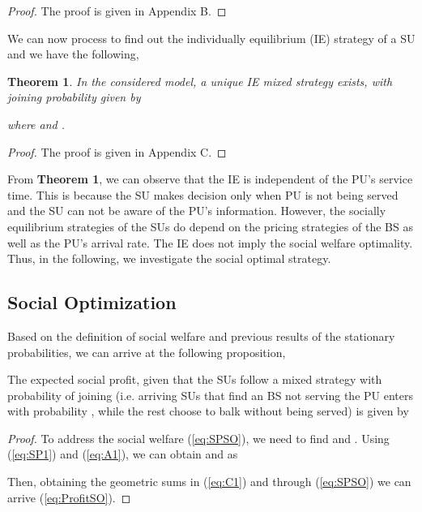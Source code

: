 \documentclass[journal]{IEEEtran}
\begin{document}
\begin{proof}
The proof is given in Appendix B.
\end{proof}

We can now process to find out the individually
equilibrium (IE) strategy of a SU and we have the following,

\theoremstyle{theorem}
\newtheorem{theorem}{Theorem}
\begin{theorem}
In the considered model, a unique IE mixed strategy exists, with
joining probability  given by



\noindent where  and .

\end{theorem}
\begin{proof}
The proof is given in Appendix C.
\end{proof}

From \textbf{Theorem 1}, we can observe that the IE is independent
of the PU's service time. This is because the SU makes decision
only when PU is not being served and the SU can not be aware of
the PU's information. However, the socially equilibrium strategies
of the SUs do depend on the pricing strategies of the BS as well
as the PU's arrival rate. The IE does not imply the social welfare
optimality. Thus, in the following, we investigate the social
optimal strategy.

\subsection{Social Optimization}

Based on the definition of social welfare and previous results of
the stationary probabilities, we can arrive at the following
proposition,

\begin{proposition}
The expected social profit, given that the SUs follow a mixed
strategy with probability  of joining (i.e. arriving
SUs that find an BS not serving the PU enters with probability ,
while the rest choose to balk without being served) is given by



\end{proposition}

\begin{proof}
To address the social welfare (\ref{eq:SPSO}), we need to find
 and . Using (\ref{eq:SP1}) and (\ref{eq:A1}), we
can obtain  and  as



Then, obtaining the geometric sums in (\ref{eq:C1}) and through
(\ref{eq:SPSO}) we can arrive (\ref{eq:ProfitSO}).
\end{proof}
\end{document}
